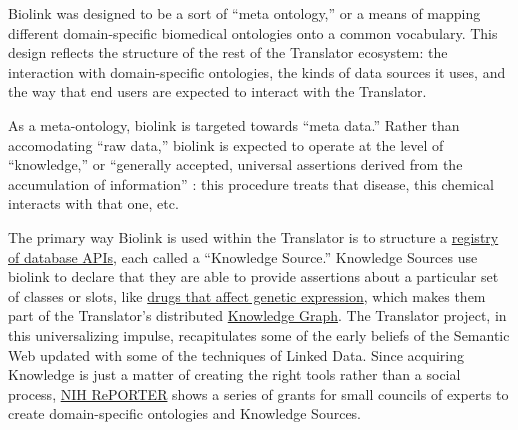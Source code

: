 Biolink was designed to be a sort of ``meta ontology,'' or a means of
mapping different domain-specific biomedical ontologies onto a common
vocabulary.
This design reflects the structure of the rest of the Translator
ecosystem: the interaction with domain-specific ontologies, the kinds of
data sources it uses, and the way that end users are expected to
interact with the Translator.

As a meta-ontology, biolink is targeted towards ``meta data.'' Rather
than accomodating ``raw data,'' biolink is expected to
operate at the level of ``knowledge,'' or ``generally accepted,
universal assertions derived from the accumulation of information'' \cite{fechoProgressUniversalBiomedical2022} : this procedure treats
that disease, this chemical interacts with that one, etc.

The primary way Biolink is used within the Translator is to structure a
\href{http://www.smart-api.info/registry}{registry of database APIs},
each called a ``Knowledge Source.'' Knowledge Sources use biolink to
declare that they are able to provide assertions about a particular set
of classes or slots, like
\href{http://www.smart-api.info/ui/adf20dd6ff23dfe18e8e012bde686e31}{drugs
that affect genetic expression}, which makes them part of the
Translator's distributed
\href{http://www.smart-api.info/portal/translator/metakg}{Knowledge
Graph}. The Translator project, in this universalizing impulse,
recapitulates some of the early beliefs of the Semantic Web updated with
some of the techniques of Linked Data. Since acquiring Knowledge is just
a matter of creating the right tools rather than a social process,
\href{https://reporter.nih.gov/search/DShVUhB_ZUq0X5UWFjy5WQ/projects?shared=true}{NIH
RePORTER} shows a series of grants for small councils of experts to
create domain-specific ontologies and Knowledge Sources.

